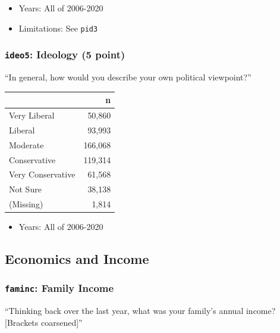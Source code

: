 \documentclass[10pt,article,oneside]{memoir}
\theoremstyle{definition}
\begin{document}
\begin{itemize}
\tightlist
\item
  Years: All of 2006-2020
\item
  Limitations: See \texttt{pid3}
\end{itemize}

\hypertarget{ideo5-ideology-5-point}{%
\subsubsection{\texorpdfstring{\texttt{ideo5}: Ideology (5
point)}{ideo5: Ideology (5 point)}}\label{ideo5-ideology-5-point}}

``In general, how would you describe your own political viewpoint?''

\begin{table}[H]
\centering
\begin{tabular}{lr}
\toprule
 & n\\
\midrule
Very Liberal & 50,860\\
Liberal & 93,993\\
Moderate & 166,068\\
Conservative & 119,314\\
Very Conservative & 61,568\\
Not Sure & 38,138\\
(Missing) & 1,814\\
\bottomrule
\end{tabular}
\end{table}

\begin{itemize}
\tightlist
\item
  Years: All of 2006-2020
\end{itemize}

\hypertarget{economics-and-income}{%
\subsection{Economics and Income}\label{economics-and-income}}

\hypertarget{faminc-family-income}{%
\subsubsection{\texorpdfstring{\texttt{faminc}: Family
Income}{faminc: Family Income}}\label{faminc-family-income}}

``Thinking back over the last year, what was your family's annual
income? {[}Brackets coarsened{]}''
\end{document}
